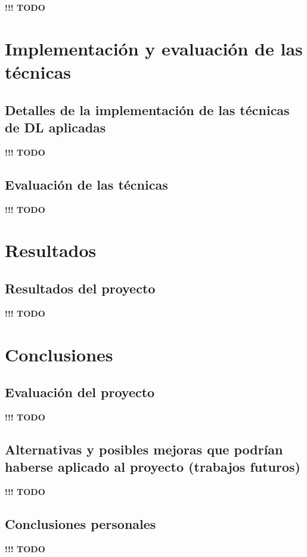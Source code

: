 \documentclass[]{article}
\begin{document}

\textbf{!!! TODO}

\section{Implementación y evaluación de las técnicas}


\subsection{Detalles de la implementación de las técnicas de DL aplicadas}


\textbf{!!! TODO}

\subsection{Evaluación de las técnicas}


\textbf{!!! TODO}

\section{Resultados}


\subsection{Resultados del proyecto}

\textbf{!!! TODO}


\section{Conclusiones}


\subsection{Evaluación del proyecto}

\textbf{!!! TODO}

\subsection{Alternativas y posibles mejoras que podrían haberse aplicado al proyecto (trabajos futuros)}

\textbf{!!! TODO}

\subsection{Conclusiones personales}

\textbf{!!! TODO}

\newpage
\printbibliography[title={Referencias}]
\end{document}
